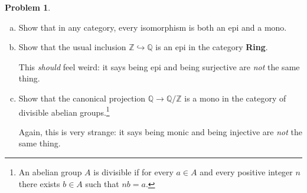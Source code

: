 \documentclass[11pt]{article}
\newcommand{\Z}{\mathbb{Z}}
\theoremstyle{definition}
\newtheorem{problem}{Problem}
\begin{document}
\begin{problem}$\,$
		\begin{enumerate}[a)]
		\item Show that in any category, every isomorphism is both an epi and a mono.
				
		\item Show that the usual inclusion $\mathbb{Z} \hookrightarrow \mathbb{Q}$ is an epi in the category {\bf Ring}. 
		
		
		\noindent
		This \emph{should} feel weird: it says being epi and being surjective are \emph{not} the same thing.
		\item Show that the canonical projection $\mathbb{Q} \longrightarrow \mathbb{Q}/\Z$ is a mono in the category of divisible abelian groups.\footnote{An abelian group $A$ is divisible if for every $a \in A$ and every positive integer $n$ there exists $b \in A$ such that $nb = a$.} 
		
		\noindent
		Again, this is very strange: it says being monic and being injective are \emph{not} the same thing. 
		\end{enumerate}
\end{problem}
\end{document}
